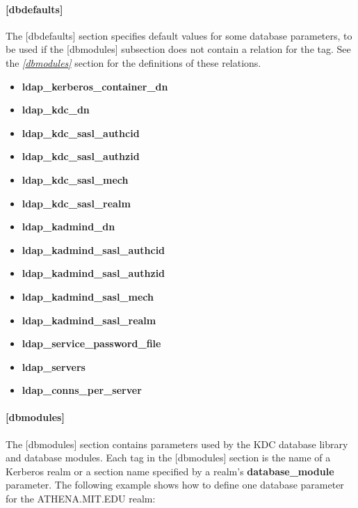 \documentclass[letterpaper,10pt,english]{sphinxmanual}
\begin{document}
\paragraph{{[}dbdefaults{]}}
\label{admin/conf_files/kdc_conf:id2}\label{admin/conf_files/kdc_conf:dbdefaults}
The {[}dbdefaults{]} section specifies default values for some database
parameters, to be used if the {[}dbmodules{]} subsection does not contain
a relation for the tag.  See the {\hyperref[admin/conf_files/kdc_conf:dbmodules]{\emph{{[}dbmodules{]}}}} section for the
definitions of these relations.
\begin{itemize}
\item {} 
\textbf{ldap\_kerberos\_container\_dn}

\item {} 
\textbf{ldap\_kdc\_dn}

\item {} 
\textbf{ldap\_kdc\_sasl\_authcid}

\item {} 
\textbf{ldap\_kdc\_sasl\_authzid}

\item {} 
\textbf{ldap\_kdc\_sasl\_mech}

\item {} 
\textbf{ldap\_kdc\_sasl\_realm}

\item {} 
\textbf{ldap\_kadmind\_dn}

\item {} 
\textbf{ldap\_kadmind\_sasl\_authcid}

\item {} 
\textbf{ldap\_kadmind\_sasl\_authzid}

\item {} 
\textbf{ldap\_kadmind\_sasl\_mech}

\item {} 
\textbf{ldap\_kadmind\_sasl\_realm}

\item {} 
\textbf{ldap\_service\_password\_file}

\item {} 
\textbf{ldap\_servers}

\item {} 
\textbf{ldap\_conns\_per\_server}

\end{itemize}


\paragraph{{[}dbmodules{]}}
\label{admin/conf_files/kdc_conf:dbmodules}\label{admin/conf_files/kdc_conf:id3}
The {[}dbmodules{]} section contains parameters used by the KDC database
library and database modules.  Each tag in the {[}dbmodules{]} section is
the name of a Kerberos realm or a section name specified by a realm's
\textbf{database\_module} parameter.  The following example shows how to
define one database parameter for the ATHENA.MIT.EDU realm:
\end{document}
